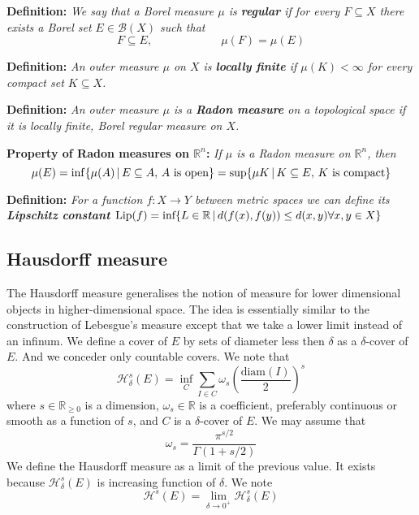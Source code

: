\documentclass{article}
\begin{document}
\vspace{2ex}
\textbf{Definition:} \textit{We say that a Borel measure $\mu$ is \textbf{regular} if
for every $F\subseteq X$ there exists a Borel set $E\in\mathcal B(X)$ such that
\[F\subseteq E,\quad\quad\quad\quad\quad\quad\mu(F)=\mu(E)\]}

\vspace{2ex}
\textbf{Definition:} \textit{An outer measure $\mu$ on $X$ is \textbf{locally finite} if
$\mu(K)<\infty$ for every compact set $K\subseteq X$.}

\vspace{2ex}
\textbf{Definition:} \textit{An outer measure $\mu$ is a \textbf{Radon measure} on a
topological space if it is locally finite, Borel regular measure on $X$.}

\vspace{2ex}
\textbf{Property of Radon measures on $\mathbb{R}^n$:} \textit{If $\mu$ is a Radon
measure on $\mathbb{R}^n$, then
\[
    \mu(E)=\inf\{\mu(A)\,|\,E\subseteq A,\,A\textnormal{ is open}\}
          =\sup\{\mu{K}\,|\,K\subseteq E,\,K\textnormal{ is compact}\}
\]}

\vspace{2ex}
\textbf{Definition:} \textit{For a function $f:X\rightarrow Y$ between metric spaces we can
define its \textbf{Lipschitz constant} $\text{Lip}(f) = \textnormal{inf}\{L\in
\mathbb{R}\,|\,d(f(x),f(y))\leq d(x,y) \forall x,y\in X\}$}

\subsection{Hausdorff measure}
The Hausdorff measure generalises the notion of measure for lower dimensional
objects in higher-dimensional space. The idea is essentially similar to the
construction of Lebesgue's measure except that we take a lower limit instead of
an infinum. We define a cover of $E$ by sets of diameter less then $\delta$ as
a $\delta$-cover of $E$. And we conceder only countable covers. We note that
\[\mathcal{H}_\delta^s(E)=\inf_{C}\sum_{I\in C}\omega_s\left(\frac{\text{diam}(I)}{2}\right)^s\]
where $s\in\mathbb{R}_{\geq 0}$ is a dimension, $\omega_s\in\mathbb{R}$ is a
coefficient, preferably continuous or smooth as a function of $s$, and $C$ is a
$\delta$-cover of $E$. We may assume that
\[\omega_s = \frac{\pi^{s/2}}{\Gamma(1+s/2)}\]
We define the Hausdorff measure as a limit of the previous value. It exists
because $\mathcal{H}_\delta^s(E)$ is increasing function of $\delta$. We note
\[\mathcal{H}^s(E)=\lim_{\delta\rightarrow0^+}\mathcal{H}^s_\delta(E)\]
\end{document}
